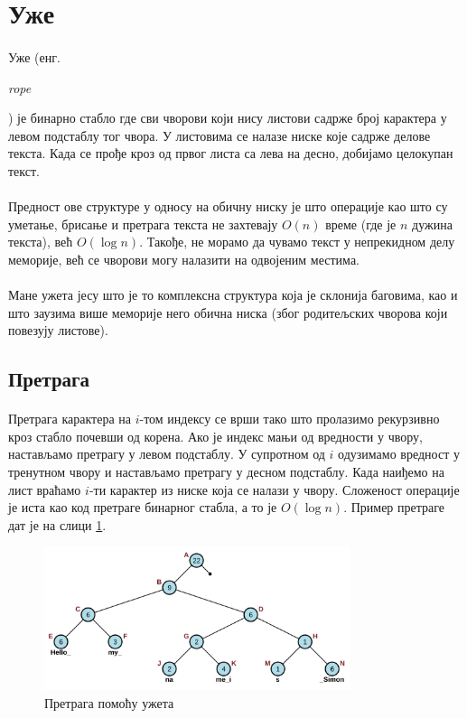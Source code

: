 \documentclass[12pt,oneside]{memoir}
\begin{document}
\section{Уже}
\paragraph{}
Уже (енг. \begin{latinica}\textit{rope}\end{latinica}) је бинарно стабло где сви чворови који нису
листови садрже број карактера у левом подстаблу тог чвора. У листовима се налазе ниске које 
садрже делове текста. Када се прође кроз од првог листа са лева на десно, добијамо целокупан
текст.

\paragraph{}
Предност ове структуре у односу на обичну ниску је што операције као што су уметање, брисање
и претрага текста не захтевају \(O(n)\) време (где је \(n\) дужина текста), већ \(O(\log{}n)\).
Такође, не морамо да чувамо текст у непрекидном делу меморије, већ се чворови могу налазити на
одвојеним местима.

\paragraph{}
Мане ужета јесу што је то комплексна структура која је склонија баговима, као и што заузима
више меморије него обична ниска (због родитељских чворова који повезују листове).

\subsection{Претрага}
\paragraph{}
Претрага карактера на \(i\)-том  индексу се врши тако што пролазимо рекурзивно кроз стабло 
почевши од корена. Ако је индекс мањи од вредности у чвору, настављамо претрагу у левом 
подстаблу. У супротном од \(i\) одузимамо вредност у тренутном чвору и настављамо претрагу у
десном подстаблу. Када наиђемо на лист враћамо \(i\)-ти карактер из ниске која се налази
у чвору. Сложеност операције је иста као код претраге бинарног стабла, а то је \(O(\log{}n)\).
Пример претраге дат је на слици \ref{fig:rope_search}.

\begin{figure}
  \centering
  \includegraphics[width=0.8\textwidth]{images/rope_search.png}
  \caption{Претрага помоћу ужета}
  \label{fig:rope_search}
\end{figure}
\end{document}
